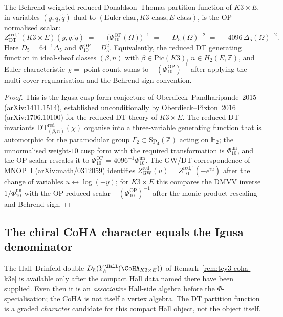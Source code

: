 \begin{theorem}
\label{thm:K3xE-dt-Phi10}
The Behrend-weighted reduced Donaldson--Thomas partition function of $K3 \times E$, in
variables $(y, q, \tilde q)$ dual to $(\mathrm{Euler~char},
 K3\text{-class}, E\text{-class})$, is the OP-normalised scalar:
\[
 Z^{\mathrm{red}, \prime}_{\mathrm{DT}}(K3 \times E)(y, q, \tilde q)
 \;=\; -\bigl(\Phi_{10}^{\mathrm{OP}}(\Omega)\bigr)^{-1}
 \;=\; -D_5(\Omega)^{-2}
 \;=\; -4096\,\Delta_5(\Omega)^{-2}.
\]
Here \(D_5=64^{-1}\Delta_5\) and
\(\Phi_{10}^{\mathrm{OP}}=D_5^2\).
Equivalently, the reduced DT generating function in ideal-sheaf classes
$(\beta, n)$ with $\beta \in \mathrm{Pic}(K3)$, $n \in H_2(E, \mathbb Z)$,
and Euler characteristic $\chi = $ point count, sums to
\(-(\Phi_{10}^{\mathrm{OP}})^{-1}\) after applying the multi-cover
regularisation and the Behrend-sign convention.
\end{theorem}

\begin{proof}
This is the Igusa cusp form conjecture of
Oberdieck--Pandharipande~2015 (arXiv:1411.1514), established
unconditionally by Oberdieck--Pixton~2016 (arXiv:1706.10100) for the
reduced DT theory of $K3 \times E$. The reduced DT invariants
$\mathrm{DT}^{\mathrm{red}}_{(\beta, n)}(\chi)$ organise into a
three-variable generating function that is automorphic for the
paramodular group $\Gamma_2 \subset \mathrm{Sp}_4(\mathbb Z)$ acting on
$\mathbb{H}_2$; the unnormalised weight-$10$ cusp form with the required
transformation is \(\Phi_{10}^{\mathrm{un}}\), and the OP scalar rescales
it to \(\Phi_{10}^{\mathrm{OP}}=4096^{-1}\Phi_{10}^{\mathrm{un}}\).
The GW/DT correspondence of MNOP~I
(arXiv:math/0312059) identifies $Z^{\mathrm{red}}_{\mathrm{GW}}(u) =
Z^{\mathrm{red}, \prime}_{\mathrm{DT}}(-e^{iu})$ after the change of
variables $u \leftrightarrow \log(-y)$; for $K3 \times E$ this compares
the DMVV inverse \(1/\Phi_{10}^{\mathrm{un}}\) with the OP reduced scalar
\(-(\Phi_{10}^{\mathrm{OP}})^{-1}\) after the monic-product rescaling and
Behrend sign.
\end{proof}

\subsection{The chiral CoHA character equals the Igusa denominator}
\label{subsec:K3xE-coha-character}

The Hall--Drinfeld double
$D_{\hbar}(Y^{\Hall}_\hbar(\CoHA_{K3\times E}))$ of
Remark~\ref{rem:tcy3-coha-k3e} is available only after the compact
Hall data named there have been supplied. Even then it is an
\emph{associative} Hall-side algebra before the $\Phi$-specialisation;
the CoHA is not itself a vertex algebra. The DT partition function is a
graded \emph{character} candidate for this compact Hall object, not the
object itself.

